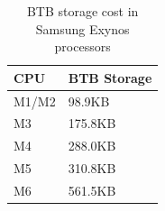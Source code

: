 \begin{table}[t]
  \centering
  \caption{\label{hpca:tab:btbcap} BTB storage cost in Samsung Exynos processors}
  \begin{tabular}{ll}\hline
    \textbf{CPU} & \textbf{BTB Storage} \\\hline
    M1/M2 & 98.9KB \\
    M3 & 175.8KB \\
    M4 & 288.0KB \\
    M5 & 310.8KB \\
    M6 & 561.5KB \\\hline
  \end{tabular}
\end{table}





